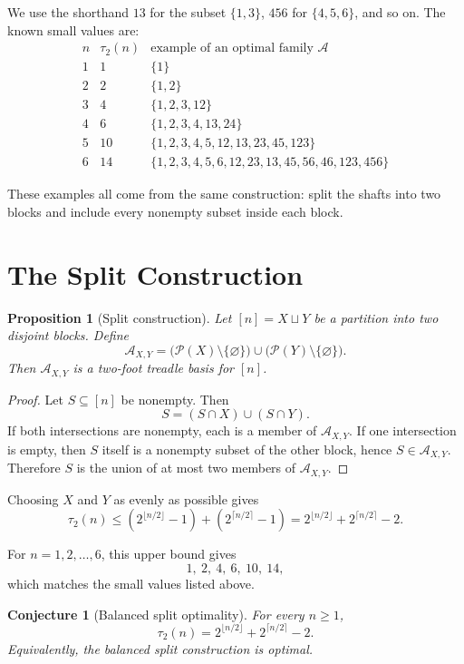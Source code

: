 \documentclass[11pt]{article}
\newtheorem{proposition}{Proposition}
\newtheorem{conjecture}{Conjecture}
\newcommand{\pow}{\mathcal{P}}
\newcommand{\A}{\mathcal{A}}
\begin{document}
We use the shorthand \(13\) for the subset \(\{1,3\}\), \(456\) for
\(\{4,5,6\}\), and so on. The known small values are:
\[
\begin{array}{c|c|l}
  n & \tau_2(n) & \text{example of an optimal family } \A\\
  \hline
  1 & 1  & \{1\}\\
  2 & 2  & \{1,2\}\\
  3 & 4  & \{1,2,3,12\}\\
  4 & 6  & \{1,2,3,4,13,24\}\\
  5 & 10 & \{1,2,3,4,5,12,13,23,45,123\}\\
  6 & 14 & \{1,2,3,4,5,6,12,23,13,45,56,46,123,456\}
\end{array}
\]

These examples all come from the same construction: split the shafts into two
blocks and include every nonempty subset inside each block.

\section{The Split Construction}

\begin{proposition}[Split construction]
  Let \([n]=X\sqcup Y\) be a partition into two disjoint blocks. Define
  \[
    \A_{X,Y}
    =
    \bigl(\pow(X)\setminus\{\varnothing\}\bigr)
    \cup
    \bigl(\pow(Y)\setminus\{\varnothing\}\bigr).
  \]
  Then \(\A_{X,Y}\) is a two-foot treadle basis for \([n]\).
\end{proposition}

\begin{proof}
  Let \(S\subseteq[n]\) be nonempty. Then
  \[
    S = (S\cap X)\cup(S\cap Y).
  \]
  If both intersections are nonempty, each is a member of \(\A_{X,Y}\). If one
  intersection is empty, then \(S\) itself is a nonempty subset of the other
  block, hence \(S\in\A_{X,Y}\). Therefore \(S\) is the union of at most two
  members of \(\A_{X,Y}\).
\end{proof}

Choosing \(X\) and \(Y\) as evenly as possible gives
\[
  \tau_2(n)
  \le
  \left(2^{\lfloor n/2\rfloor}-1\right)
  +
  \left(2^{\lceil n/2\rceil}-1\right)
  =
  2^{\lfloor n/2\rfloor}
  +
  2^{\lceil n/2\rceil}
  -2.
\]

For \(n=1,2,\ldots,6\), this upper bound gives
\[
  1,\ 2,\ 4,\ 6,\ 10,\ 14,
\]
which matches the small values listed above.

\begin{conjecture}[Balanced split optimality]
  For every \(n\ge 1\),
  \[
    \tau_2(n)
    =
    2^{\lfloor n/2\rfloor}
    +
    2^{\lceil n/2\rceil}
    -2.
  \]
  Equivalently, the balanced split construction is optimal.
\end{conjecture}
\end{document}
